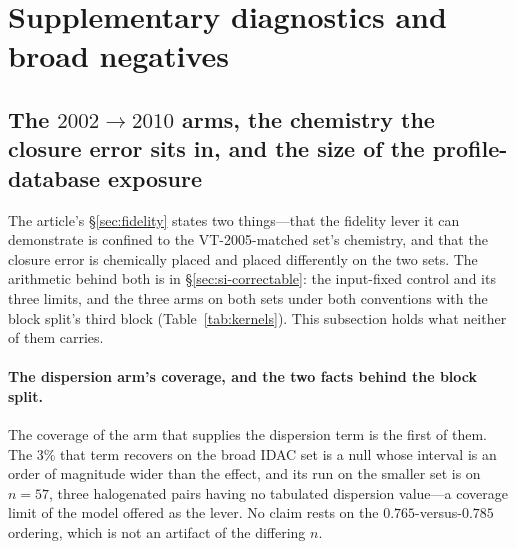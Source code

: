 \section{Supplementary diagnostics and broad negatives}
\label{sec:si-diagnostics}






\subsection{The $2002\to2010$ arms, the chemistry the closure error sits in, and the size of the
profile-database exposure}
\label{sec:si-fidelity}
The article's \S\ref{sec:fidelity} states two things---that the fidelity lever it can demonstrate is
confined to the VT-2005-matched set's chemistry, and that the closure error is chemically placed and
placed differently on the two sets. The arithmetic behind both is in
\S\ref{sec:si-correctable}: the input-fixed control and its three limits, and the three arms on
both sets under both conventions with the block split's third block (Table~\ref{tab:kernels}). This
subsection holds what neither of them carries.

\paragraph{The dispersion arm's coverage, and the two facts behind the block split.}
The coverage of the arm that supplies the dispersion term is the first of them. The $3\%$ that term
recovers on the broad IDAC set is a null whose interval is an order of magnitude wider than the
effect, and its run on the smaller set is on $n{=}57$, three halogenated pairs having no tabulated
dispersion value---a coverage limit of the model offered as the lever. No claim rests on the
$0.765$-versus-$0.785$ ordering, which is not an artifact of the differing $n$.

